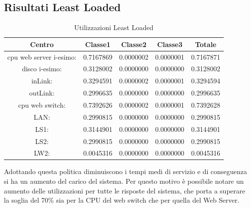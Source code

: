 \subsection{Risultati Least Loaded}
\begin{table}[htbp]
\begin{center}
\begin{tabular}{||c|c|c|c|c||}
\hline
Centro &Classe1 &Classe2 &Classe3 &Totale\\
\hline
\hline
 cpu web server i-esimo: 	&0.7167869	&0.0000002	&0.0000001	&0.7167871\\
\hline
 disco i-esimo: 	&0.3128002	&0.0000000	&0.0000000	&0.3128002\\
\hline
 inLink: 	&0.3294591	&0.0000002	&0.0000001	&0.3294594\\
\hline
 outLink: 	&0.2996635	&0.0000000	&0.0000000	&0.2996635\\
\hline
 cpu web switch: 	&0.7392626	&0.0000002	&0.0000001	&0.7392628\\
\hline
 LAN: 	&0.2990815	&0.0000000	&0.0000000	&0.2990815\\
\hline
 LS1: 	&0.3144901	&0.0000000	&0.0000000	&0.3144901\\
\hline
 LS2:	&0.2990815	&0.0000000	&0.0000000	&0.2990815\\
\hline
 LW2: 	&0.0045316	&0.0000000	&0.0000000	&0.0045316\\
\hline
\end{tabular}
\end{center}
\caption{Utilizzazioni Least Loaded}
\label{utilizzazioni}
\end{table}
Adottando questa politica diminuiscono i tempi medi di servizio e di conseguenza si ha un aumento del carico del sistema. Per questo motivo è possibile notare un aumento delle utilizzazioni per tutte le risposte del sistema, che porta a superare la soglia del 70\% sia per la CPU del web switch che per quella del Web Server.

